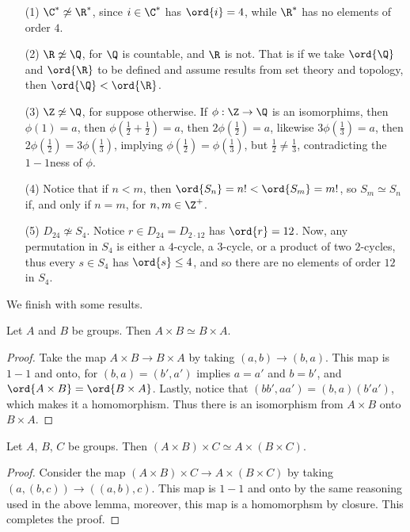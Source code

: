 \begin{example}
    \begin{enumerate}
        \item[(1)] $\C^* \not\simeq \R^*$, since $i \in \C^*$ has  $\ord{i}=4$,
            while $\R^*$ has no elements of order  $4$.

        \item [(2)] $\R \not\simeq \Q$, for  $\Q$ is countable, and  $\R$ is
            not. That is if we take  $\ord{\Q}$ and $\ord{\R}$ to be defined and
            assume results from set theory and topology, then $\ord{\Q}<
            \ord{\R}$.

        \item[(3)] $\Z \not\simeq \Q$, for suppose otherwise. If  $\phi:\Z
            \rightarrow \Q$ is an isomorphims, then $\phi(1)=a$, then
            $\phi(\frac{1}{2}+\frac{1}{2})=a$, then $2\phi(\frac{1}{2})=a$,
            likewise $3\phi(\frac{1}{3})=a$, then $2\phi(\frac{1}{2})=
            3\phi(\frac{1}{3})$, implying $\phi(\frac{1}{2})=\phi(\frac{1}{3})$,
            but $\frac{1}{2} \neq \frac{1}{3}$, contradicting the $1-1$ness of
            $\phi$.

        \item[(4)] Notice that if $n<m$, then  $\ord{S_n}=n!<\ord{S_m}=m!$, so
            $S_m \simeq S_n$ if, and only if  $n=m$, for $n,m \in \Z^+$.

        \item[(5)] $D_{24} \not\simeq S_4$. Notice $r \in D_{24}=D_{2 \cdot 12}$
            has $\ord{r}=12$. Now, any permutation in $S_4$ is either a
            $4$-cycle, a  $3$-cycle, or a product of two  $2$-cycles, thus every
             $s \in S_4$ has  $\ord{s} \leq 4$, and so there are no elements of
             order $12$ in  $S_4$.
    \end{enumerate}
\end{example}

 We finish with some results.

\begin{lemma}\label{1.6.5}
    Let $A$ and  $B$ be groups. Then  $A \times B \simeq B \times A$.
\end{lemma}
\begin{proof}
    Take the map $A \times B \rightarrow B \times A$ by taking $(a,b)
    \rightarrow (b,a)$. This map is $1-1$ and onto, for $(b,a)=(b',a')$ implies
    $a=a'$ and  $b=b'$, and  $\ord{A \times B}=\ord{B \times A}$. Lastly,
    notice that $(bb',aa')=(b,a)(b'a')$, which makes it a homomorphism. Thus
    there is an isomorphism from  $A \times B$ onto  $B \times A$.
\end{proof}

\begin{lemma}\label{1.5.7}
    Let $A$,  $B$,  $C$ be groups. Then  $(A \times B) \times C \simeq A \times
    (B \times C)$.
\end{lemma}
\begin{proof}
    Consider the map $(A \times B) \times C \rightarrow A \times (B \times C)$
    by taking $(a,(b,c)) \rightarrow ((a,b),c)$. This map is $1-1$ and onto by
    the same reasoning used in the above lemma, moreover, this map is a
    homomorphsm by closure. This completes the proof.
\end{proof}
